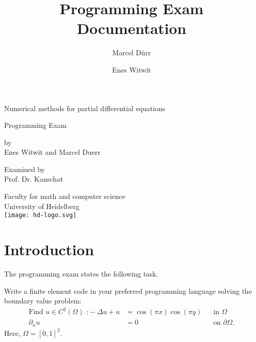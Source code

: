 \documentclass[a4paper,12pt]{article}
\begin{document}
\title{Programming Exam Documentation}

\author{Marcel Dürr \and Enes Witwit}

\pagestyle{empty}




\begin{titlepage}

\begin{center} 
{\Huge Numerical methods for partial differential equations}
\vspace*{1cm}

{\Large Programming Exam}
\vspace*{1.5cm}

by \\[0.5cm]

{\Large Enes Witwit and Marcel Duerr}
\vspace*{1.5cm}

Examined by  \\[0.5cm]
{\Large Prof. Dr. Kanschat}
\vspace*{3cm}

Faculty for math and computer science\\[0.5cm]
University of Heidelberg \\[0.8cm]
\texttt{[image: hd-logo.svg]} 
\end{center}
\end{titlepage}

\section{Introduction}
The programming exam states the following task.
\begin{framed}
Write a finite element code in your preferred programming language solving the boundary value problem:
\begin{align}
\mbox{Find } u\in C^2(\Omega)\mbox{ :}-\Delta u+u &= \cos(\pi x)\cos(\pi y) &&\mbox{in } \Omega \\
\partial _n u &= 0 &&\mbox{on } \partial\Omega.
\end{align}
Here, $\Omega = [0,1]^2$.
\end{framed}
\end{document}
